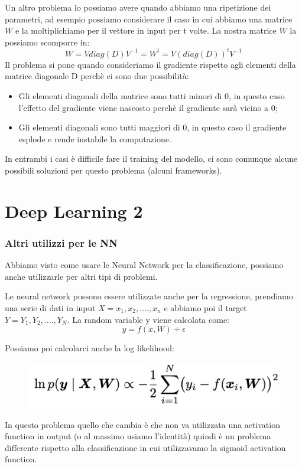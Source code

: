 \documentclass[14pt]{extreport}
\begin{document}
Un altro problema lo possiamo avere quando abbiamo una ripetizione dei parametri, ad esempio possiamo considerare il caso in cui abbiamo una matrice
$W$ e la moltiplichiamo per il vettore in input per t volte. La nostra matrice $W$ la possiamo scomporre in:
$$W = V diag(D) V^{-1} = W^{t} = V(diag(D))^tV^{-1}$$ Il problema si pone quando consideriamo il gradiente rispetto agli elementi della matrice
diagonale D perchè ci sono due possibilità:
\begin{itemize}
\item Gli elementi diagonali della matrice sono tutti minori di 0, in questo caso l'effetto del gradiente viene nascosto perchè il gradiente sarà
vicino a 0;
\item Gli elementi diagonali sono tutti maggiori di 0, in questo caso il gradiente esplode e rende instabile la computazione.
\end{itemize}

In entrambi i casi è difficile fare il training del modello, ci sono comunque alcune possibili soluzioni per questo problema (alcuni frameworks).


\chapter{Deep Learning 2}

\subsection{Altri utilizzi per le NN}

Abbiamo visto come usare le Neural Network per la classificazione, possiamo anche utilizzarle per altri tipi di problemi.

Le neural network possono essere utilizzate anche per la regressione, prendiamo una serie di dati in input $X = {x_1, x_2,....,x_n}$ e abbiamo poi il
target $Y = {Y_1,Y_2,....,Y_N}$. La random variable y viene calcolata come: $$y = f(x,W) + \epsilon$$

Possiamo poi calcolarci anche la log likelihood:

\begin{figure}[H]
\centering
\includegraphics[width=0.7\linewidth]{402.jpeg}
\end{figure}

In questo problema quello che cambia è che non va utilizzata una activation function in output (o al massimo usiamo l'identità) quindi è un problema
differente rispetto alla classificazione in cui utilizzavamo la sigmoid activation function.
\end{document}
